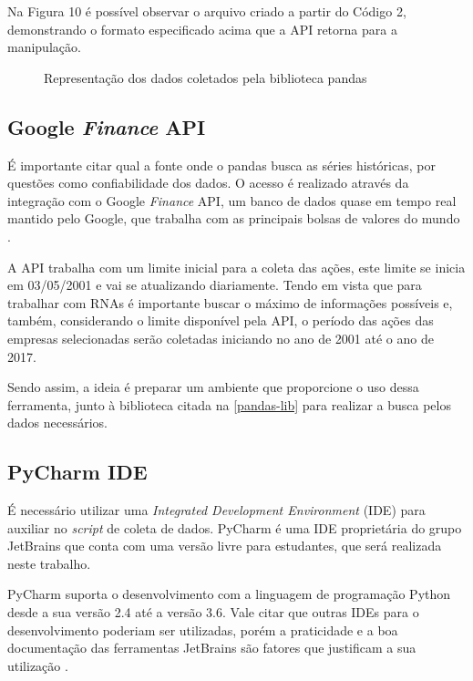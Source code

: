 Na Figura 10 é possível observar o arquivo criado a partir do Código 2, demonstrando o formato especificado acima que a API retorna para a manipulação.

\begin{figure}[h]
	\centering
	\caption{Representação dos dados coletados pela biblioteca pandas}
	\label{exec-coleta-dados}
\end{figure}

\subsection{Google \textit{Finance} API}
É importante citar qual a fonte onde o pandas busca as séries históricas, por questões como confiabilidade dos dados. O acesso é realizado através da integração com o Google \textit{Finance} API, um banco de dados quase em tempo real mantido pelo Google, que trabalha com as principais bolsas de valores do mundo \cite{pandas}.

A API trabalha com um limite inicial para a coleta das ações, este limite se inicia em 03/05/2001 e vai se atualizando diariamente. Tendo em vista que para trabalhar com RNAs é importante buscar o máximo de informações possíveis e, também, considerando o limite disponível pela API, o período das ações das empresas selecionadas serão coletadas iniciando no ano de 2001 até o ano de 2017. 

Sendo assim, a ideia é preparar um ambiente que proporcione o uso dessa ferramenta, junto à biblioteca citada na \autoref{pandas-lib} para realizar a busca pelos dados necessários.

\subsection{PyCharm IDE}
É necessário utilizar uma \textit{Integrated Development Environment} (IDE) para auxiliar no \textit{script} de coleta de dados. PyCharm é uma IDE proprietária do grupo JetBrains que conta com uma versão livre para estudantes, que será realizada neste trabalho.
 
PyCharm suporta o desenvolvimento com a linguagem de programação Python desde a sua versão 2.4 até a versão 3.6. Vale citar que outras IDEs para o desenvolvimento poderiam ser utilizadas, porém a praticidade e a boa documentação das ferramentas JetBrains são fatores que justificam a sua utilização \cite{pycharm}.

